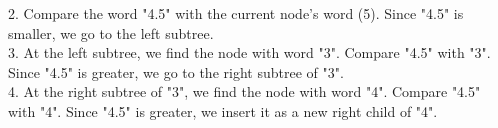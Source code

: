 \documentclass[preview]{standalone}
\begin{document}
2. Compare the word "4.5" with the current node's word (5). Since "4.5" is smaller, we go to the left subtree.\\3. At the left subtree, we find the node with word "3". Compare "4.5" with "3". Since "4.5" is greater, we go to the right subtree of "3".\\4. At the right subtree of "3", we find the node with word "4". Compare "4.5" with "4". Since "4.5" is greater, we insert it as a new right child of "4".\\
\end{document}
